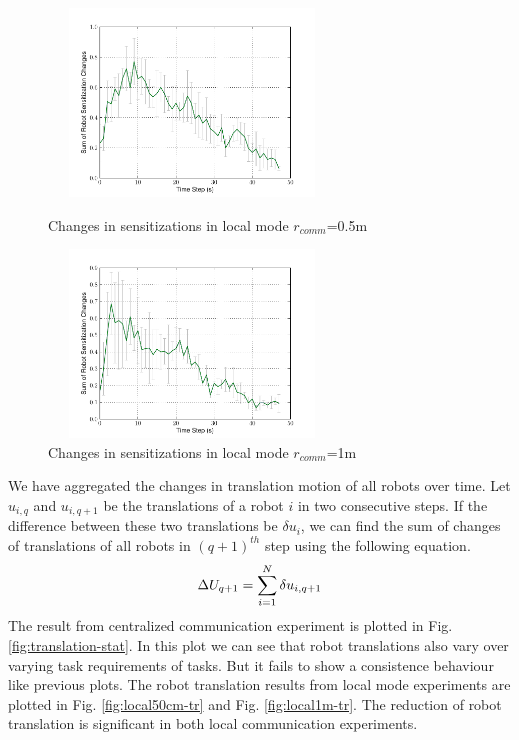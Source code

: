 \documentclass[letterpaper, 10 pt, times, conference]{ieeeconf} %
\begin{document}
\begin{figure}
\begin{minipage}[t]{0.5\linewidth}
\centering
\includegraphics[height=5cm,width=3in]
{images/local-500cm/RobotSensitizationStat-Total-50steps}
\caption{\small Changes in sensitizations  in local mode $r_{comm}$=0.5m}
\label{fig:local50cm-sensitization-stat} %
\end{minipage}
\hspace{0.5cm}
\begin{minipage}[t]{0.5\linewidth}
\centering
\includegraphics[height=5cm,width=3in]{images/local-1m/RobotSensitizationStat-Total-50steps}
\caption{\small Changes in sensitizations  in local mode $r_{comm}$=1m}
\label{fig:local1m-sz} %
\end{minipage}
\end{figure}
We have aggregated the changes in translation motion of all robots over time. Let $u_{i,q}$ and $u_{i,q+1}$ be the translations of a robot $i$ in two consecutive steps. If the difference between these two translations be $\delta u_{i}$, we can find the sum of changes of translations of all robots in $(q+1)^{th}$ step using the following equation.
\begin{equation}
\small 
\Delta U_{q+1} = \sum_{i=1}^{N} \delta u_{i, q+1} 
\label{eqn:Delta-Tr}
\end{equation}
The result from centralized communication experiment is plotted in Fig. \ref{fig:translation-stat}. In this plot we can see that robot translations also vary over varying task requirements of tasks. But it fails to show a consistence behaviour like previous plots. The robot translation results from local mode experiments are plotted in Fig. \ref{fig:local50cm-tr} and Fig. \ref{fig:local1m-tr}. The reduction of robot translation is significant in both local communication experiments.\\
\end{document}
